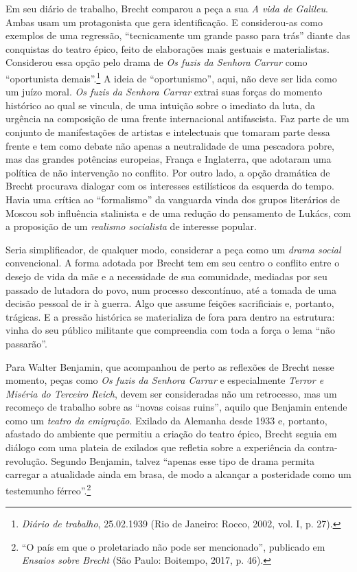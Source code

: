 Em seu diário de trabalho, Brecht comparou a peça a sua \textit{A vida de
Galileu}. Ambas usam um protagonista que gera identificação. E
considerou-as como exemplos de uma regressão, “tecnicamente um grande
passo para trás” diante das conquistas do teatro épico, feito de
elaborações mais gestuais e materialistas. Considerou essa opção pelo
drama de \textit{Os fuzis da Senhora Carrar} como “oportunista
demais”.\footnote{\textit{Diário de trabalho}, 25.02.1939 (Rio de Janeiro:
  Rocco, 2002, vol. I, p. 27).} A ideia de “oportunismo”, aqui, não deve
ser lida como um juízo moral. \textit{Os fuzis da Senhora Carrar} extrai
suas forças do momento histórico ao qual se vincula, de uma intuição
sobre o imediato da luta, da urgência na composição de uma frente
internacional antifascista. Faz parte de um conjunto de manifestações de
artistas e intelectuais que tomaram parte dessa frente e tem como debate
não apenas a neutralidade de uma pescadora pobre, mas das grandes
potências europeias, França e Inglaterra, que adotaram uma política de
não intervenção no conflito. Por outro lado, a opção dramática de Brecht
procurava dialogar com os interesses estilísticos da esquerda do tempo.
Havia uma crítica ao “formalismo” da vanguarda vinda dos grupos
literários de Moscou sob influência stalinista e de uma redução do
pensamento de Lukács, com a proposição de um \textit{realismo socialista}
de interesse popular.

Seria simplificador, de qualquer modo, considerar a peça como um
\textit{drama social} convencional. A forma adotada por Brecht tem em seu
centro o conflito entre o desejo de vida da mãe e a necessidade de sua
comunidade, mediadas por seu passado de lutadora do povo, num processo
descontínuo, até a tomada de uma decisão pessoal de ir à guerra. Algo
que assume feições sacrificiais e, portanto, trágicas. E a pressão
histórica se materializa de fora para dentro na estrutura: vinha do seu
público militante que compreendia com toda a força o lema “não
passarão”.

Para Walter Benjamin, que acompanhou de perto as reflexões de Brecht
nesse momento, peças como \textit{Os fuzis da Senhora Carrar} e
especialmente \textit{Terror e Miséria do Terceiro Reich}, devem ser
consideradas não um retrocesso, mas um recomeço de trabalho sobre as
“novas coisas ruins”, aquilo que Benjamin entende como um \textit{teatro da
emigração}. Exilado da Alemanha desde 1933 e, portanto, afastado do
ambiente que permitiu a criação do teatro épico, Brecht seguia em
diálogo com uma plateia de exilados que refletia sobre a experiência da
contra-revolução. Segundo Benjamin, talvez “apenas esse tipo de drama
permita carregar a atualidade ainda em brasa, de modo a alcançar a
posteridade como um testemunho férreo”.\footnote{“O país em que o
  proletariado não pode ser mencionado”, publicado em \textit{Ensaios sobre
  Brecht} (São Paulo: Boitempo, 2017, p. 46).}

